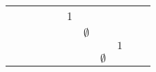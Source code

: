 \begin{table}[]
\begin{tabular}{lllllllllll}
                          &                           &                   &                                                               &                                                                                                                 & \cellcolor[HTML]{FC8D59}1 &                                                             &                                                                            &                                                                                          &                                        &                                                                                                                 \\
                          &                           &                   &                                                               &                                                                                                                 &                           & \cellcolor[HTML]{FC8D59}$\emptyset$                         &                                                                            &                                                                                          &                                        &                                                                                                                 \\
                          &                           &                   &                                                               &                                                                                                                 &                           &                                                             &                                                                            & \cellcolor[HTML]{FC8D59}$1$                                                              &                                        &                                                                                                                 \\
                          &                           &                   &                                                               &                                                                                                                 &                           &                                                             & \cellcolor[HTML]{FC8D59}$\emptyset$                                        &                                                                                          &                                        &                                                                                                                 \\

\end{tabular}
\end{table}
